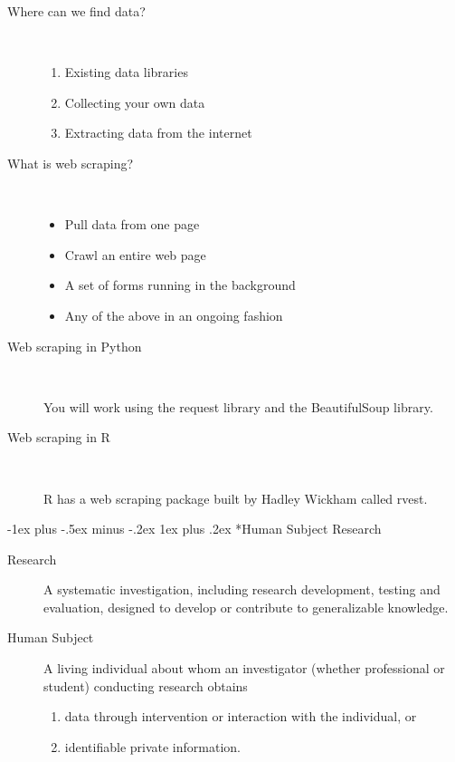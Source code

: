 \documentclass[a4paper,10pt,landscape]{article}
\makeatletter
\renewcommand{\subsubsection}{\@startsection{subsubsection}{3}{0mm}%
                                {-1ex plus -.5ex minus -.2ex}%
                                {1ex plus .2ex}%
                                {\normalfont\small\bfseries}}
\makeatother
\begin{document}
\begin{multicols*}{3}
\begin{description}
	\item[Where can we find data?] ~
	\begin{enumerate}[noitemsep,topsep=0pt]
		\item Existing data libraries
		\item Collecting your own data
		\item Extracting data from the internet
	\end{enumerate}
	\item[What is web scraping?] ~
	\begin{itemize}[noitemsep,topsep=0pt]
		\item Pull data from one page
		\item Crawl an entire web page
		\item A set of forms running in the background
		\item Any of the above in an ongoing fashion
	\end{itemize}
	\item[Web scraping in Python] ~
	
	You will work using the request library and the BeautifulSoup library.
	\item[Web scraping in R] ~
	
	R has a web scraping package built by Hadley Wickham called rvest.
\end{description}

\subsubsection*{Human Subject Research}
\begin{description}
	\item[Research] A systematic investigation, including research development, testing and evaluation, designed to develop or contribute to generalizable knowledge.
	\item[Human Subject] A living individual about whom an investigator (whether professional or student) conducting research obtains
	\begin{enumerate}[noitemsep]
		\item data through intervention or interaction with the individual, or
		\item identifiable private information.
	\end{enumerate}
\end{description}


\end{multicols*}
\end{document}
